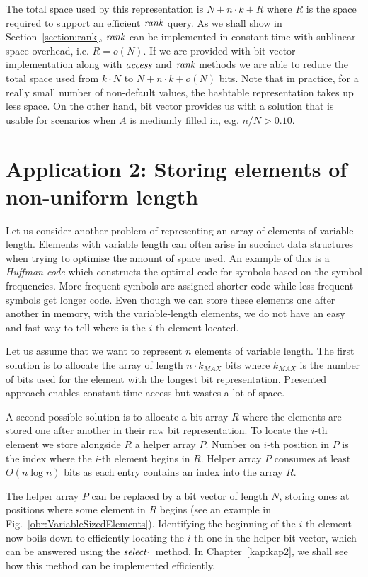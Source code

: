 The total space used by this representation is $N+n\cdot k+R$ where $R$ is the space required
to support an efficient $\mathit{rank}$ query. As we shall show in Section~\ref{section:rank}, $\mathit{rank}$
can be implemented in constant time with sublinear space overhead, i.e. $R = o(N)$. If we are
provided with bit vector implementation along with $\mathit{access}$ and $\mathit{rank}$ methods we are able to
reduce the total space used from $k\cdot N$ to $N+n\cdot k+o(N)$ bits. Note that in practice,
for a really small number of non-default values, the hashtable representation takes up less
space. On the other hand, bit vector provides us with a solution that is usable for scenarios
when $A$ is mediumly filled in, e.g. $n/N>0.10$.

\section{Application 2: Storing elements of non-uniform length}

Let us consider another problem of representing an array of elements of variable length.
Elements with variable length can often arise in succinct data structures when trying to
optimise the amount of space used. An example of this is a \textit{Huffman code} \citep{huffman1952method}
which constructs the optimal code for symbols based on the symbol frequencies. More frequent
symbols are assigned shorter code while less frequent symbols get longer code.
Even though we can store these elements one after another in memory, with the variable-length
elements, we do not have an easy and fast way to tell where is the $i$-th element located.

Let us assume that we want to represent $n$ elements of variable length. The first solution
is to allocate the array of length $n\cdot k_{MAX}$ bits where $k_{MAX}$ is the number of
bits used for the element with the longest bit representation. Presented approach enables
constant time access but wastes a lot of space.

A second possible solution is to allocate a bit array $R$ where the elements are stored
one after another in their raw bit representation. To locate the $i$-th element we store
alongside $R$ a helper array $P$. Number on $i$-th position in $P$ is the index where the
$i$-th element begins in $R$. Helper array $P$ consumes at least $\Theta(n\log n)$ bits
as each entry contains an index into the array $R$.

The helper array $P$ can be replaced by a bit vector of length $N$, storing
ones at positions where some element in $R$ begins (see an example in
Fig.~\ref{obr:VariableSizedElements}). Identifying the beginning of the $i$-th element now
boils down to efficiently locating the $i$-th one in the helper bit vector, which can be
answered using the $\mathit{select}_1$ method. In Chapter~\ref{kap:kap2}, we shall see how this
method can be implemented efficiently.

